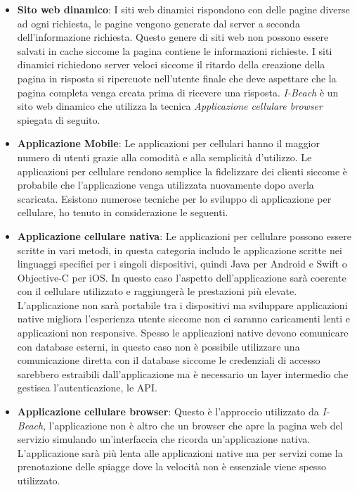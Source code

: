 \begin{itemize}
    Questo approccio necessit\`a di API pubbliche accessibili da parte del client.
    \item \textbf{Sito web dinamico}: I siti web dinamici rispondono con delle pagine diverse ad ogni richiesta, le pagine vengono generate dal server a seconda dell'informazione richiesta. Questo genere di siti web non possono essere salvati in cache siccome la pagina contiene le informazioni richieste. I siti dinamici richiedono server veloci siccome il ritardo della creazione della pagina in risposta si ripercuote nell'utente finale che deve aspettare che la pagina completa venga creata prima di ricevere una risposta. \emph{I-Beach} \`e un sito web dinamico che utilizza la tecnica \textit{Applicazione cellulare browser} spiegata di seguito.
    \item \textbf{Applicazione Mobile}: Le applicazioni per cellulari hanno il maggior numero di utenti grazie alla comodit\`a e alla semplicit\`a d'utilizzo. Le applicazioni per cellulare rendono semplice la fidelizzare dei clienti siccome \`e probabile che l'applicazione venga utilizzata nuovamente dopo averla scaricata. Esistono numerose tecniche per lo sviluppo di applicazione per cellulare, ho tenuto in considerazione le seguenti.
    \item \textbf{Applicazione cellulare nativa}: Le applicazioni per cellulare possono essere scritte in vari metodi, in questa categoria includo le applicazione scritte nei linguaggi specifici per i singoli dispositivi, quindi Java per Android e Swift o Objective-C per iOS. In questo caso l'aspetto dell'applicazione sar\`a coerente con il cellulare utilizzato e raggiunger\`a le prestazioni pi\`u elevate. L'applicazione non sar\`a portabile tra i dispositivi ma sviluppare applicazioni native migliora l'esperienza utente siccome non ci saranno caricamenti lenti e applicazioni non responsive. Spesso le applicazioni native devono comunicare con database esterni, in questo caso non \`e possibile utilizzare una comunicazione diretta con il database siccome le credenziali di accesso sarebbero estraibili dall'applicazione ma \`e necessario un layer intermedio che gestisca l'autenticazione, le API\@.
    \item \textbf{Applicazione cellulare browser}: Questo \`e l'approccio utilizzato da \emph{I-Beach}, l'applicazione non \`e altro che un browser che apre la pagina web del servizio simulando un'interfaccia che ricorda un'applicazione nativa. L'applicazione sar\`a pi\`u lenta alle applicazioni native ma per servizi come la prenotazione delle spiagge dove la velocit\`a non \`e essenziale viene spesso utilizzato.

\end{itemize}
